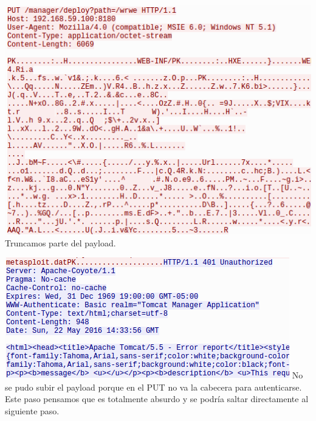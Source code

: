 \documentclass[a4paper,12pt]{scrartcl}
\begin{document}
\begin{center}
	\includegraphics[width=1\linewidth]{cap3-1}
	Truncamos parte del payload.
\end{center}
\begin{center}
	\includegraphics[width=1\linewidth]{cap3-2}
	No se pudo subir el payload porque en el PUT no va la cabecera para autenticarse. Este paso pensamos que es totalmente absurdo y se podría saltar directamente al siguiente paso.
\end{center}

\newpage
\end{document}

